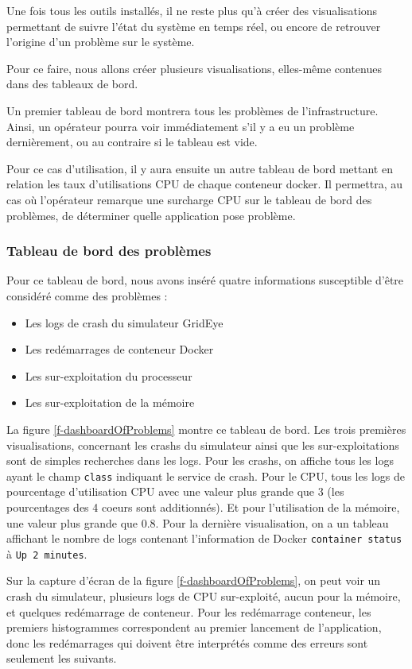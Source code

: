 \documentclass[paper=a4, fontsize=11pt]{scrartcl}
\begin{document}
Une fois tous les outils installés, il ne reste plus qu'à créer des visualisations permettant de suivre l'état du système en temps réel, ou encore de retrouver l'origine d'un problème sur le système.

Pour ce faire, nous allons créer plusieurs visualisations, elles-même contenues dans des tableaux de bord.

Un premier tableau de bord montrera tous les problèmes de l'infrastructure. Ainsi, un opérateur pourra voir immédiatement s'il y a eu un problème dernièrement, ou au contraire si le tableau est vide.

Pour ce cas d'utilisation, il y aura ensuite un autre tableau de bord mettant en relation les taux d'utilisations CPU de chaque conteneur docker. Il permettra, au cas où l'opérateur remarque une surcharge CPU sur le tableau de bord des problèmes, de déterminer quelle application pose problème.

\subsubsection{Tableau de bord des problèmes} \label{sss-tableauDeBordDesProblemes}

Pour ce tableau de bord, nous avons inséré quatre informations susceptible d'être considéré comme des \og problèmes \fg :
\begin{itemize}
    \item Les logs de crash du simulateur GridEye
    \item Les redémarrages de conteneur Docker
    \item Les sur-exploitation du processeur
    \item Les sur-exploitation de la mémoire
\end{itemize}

La figure \ref{f-dashboardOfProblems} montre ce tableau de bord. Les trois premières visualisations, concernant les crashs du simulateur ainsi que les sur-exploitations sont de simples recherches dans les logs. Pour les crashs, on affiche tous les logs ayant le champ \verb,class, indiquant le service de crash. Pour le CPU, tous les logs de pourcentage d'utilisation CPU avec une valeur plus grande que 3 (les pourcentages des 4 coeurs sont additionnés). Et pour l'utilisation de la mémoire, une valeur plus grande que 0.8. Pour la dernière visualisation, on a un tableau affichant le nombre de logs contenant l'information de Docker \verb,container status, à \verb,Up 2 minutes,.

Sur la capture d'écran de la figure \ref{f-dashboardOfProblems}, on peut voir un crash du simulateur, plusieurs logs de CPU sur-exploité, aucun pour la mémoire, et quelques redémarrage de conteneur. Pour les redémarrage conteneur, les premiers histogrammes correspondent au premier lancement de l'application, donc les redémarrages qui doivent être interprétés comme des erreurs sont seulement les suivants.
\end{document}
